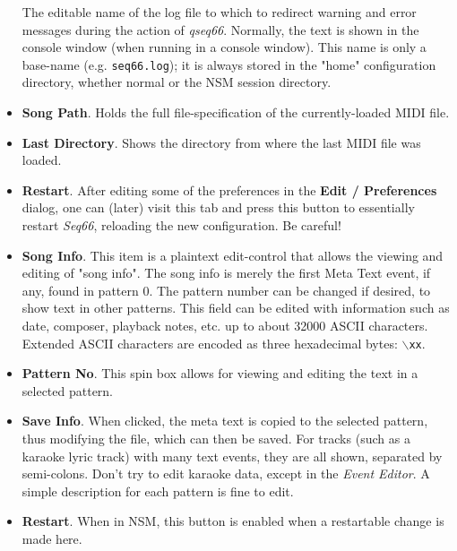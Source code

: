 \begin{itemize}
         The editable name of the log file
         to which to redirect warning
         and error messages during the action of \textsl{qseq66}.
         Normally, the text is shown in the console window (when running in a
         console window). This name is only a base-name (e.g.
         \texttt{seq66.log}); it is always stored in the "home" configuration
         directory, whether normal or the NSM session directory.
      \item \textbf{Song Path}.
         Holds the full file-specification of the currently-loaded MIDI
         file.
      \item \textbf{Last Directory}.
         Shows the directory from where the last MIDI file was loaded.
      \item \textbf{Restart}.
         After editing some of the preferences in the \textbf{Edit / Preferences}
         dialog, one can (later)
         visit this tab and press this button to essentially
         restart \textsl{Seq66}, reloading the new configuration.
         Be careful!
      \item \textbf{Song Info}.
         This item is a plaintext edit-control that allows the viewing and
         editing of "song info".
         The song info is merely the first Meta Text event, if any,
         found in pattern 0.
         The pattern number can be changed if desired, to show text in other
         patterns.
         This field can be edited with information such as date, composer,
         playback notes, etc. up to about 32000 ASCII characters.
         Extended ASCII characters are encoded as three hexadecimal
         bytes: \texttt{$\backslash$xx}.
      \item \textbf{Pattern No}.
         This spin box allows for viewing and editing the text
         in a selected pattern.
      \item \textbf{Save Info}.
         When clicked, the meta text is copied to the selected pattern,
         thus modifying the file, which can then be saved.
         For tracks (such as a karaoke lyric track) with many text events,
         they are all shown, separated by semi-colons.
         Don't try to edit karaoke data, except in the \textsl{Event Editor}.
         A simple description for each pattern is fine to edit.
      \item \textbf{Restart}.
         When in NSM, this button is enabled when a restartable change is
         made here.
   \end{itemize}

